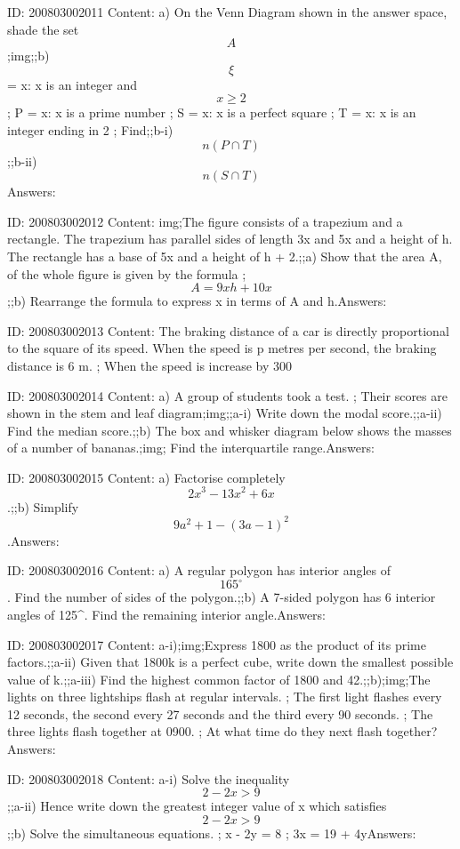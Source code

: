 \documentclass{article}
\begin{document}
ID: 200803002011
Content:
a) On the Venn Diagram shown in the answer space, shade the set $$A$$;img;;b) $$\xi$$ = {x: x is an integer and $$x \geq  2$$} ; P = {x: x is a prime number} ; S = {x: x is a perfect square} ; T = {x: x is an integer ending in 2} ; Find;;b-i) $$n(P \cap T)$$;;b-ii) $$n(S \cap T)$$Answers:

ID: 200803002012
Content:
img;The figure consists of a trapezium and a rectangle. The trapezium has parallel sides of length 3x and 5x and a height of h. The rectangle has a base of 5x and a height of h + 2.;;a) Show that the area A, of the whole figure is given by the formula ; $$A = 9xh + 10x$$;;b) Rearrange the formula to express x in terms of A and h.Answers:

ID: 200803002013
Content:
The braking distance of a car is directly proportional to the square of its speed. When the speed is p metres per second, the braking distance is 6 m. ; When the speed is increase by 300%

ID: 200803002014
Content:
a) A group of students took a test. ; Their scores are shown in the stem and leaf diagram;img;;a-i) Write down the modal score.;;a-ii) Find the median score.;;b) The box and whisker diagram below shows the masses of a number of bananas.;img; Find the interquartile range.Answers:

ID: 200803002015
Content:
a) Factorise completely $$2x^3 - 13x^2 + 6x$$.;;b) Simplify $$9a^2 + 1 - (3a - 1)^2$$.Answers:

ID: 200803002016
Content:
a) A regular polygon has interior angles of $$165^{\circ}$$. Find the number of sides of the polygon.;;b) A 7-sided polygon has 6 interior angles of 125^{\circ}. Find the remaining interior angle.Answers:

ID: 200803002017
Content:
a-i);img;Express 1800 as the product of its prime factors.;;a-ii) Given that 1800k is a perfect cube, write down the smallest possible value of k.;;a-iii) Find the highest common factor of 1800 and 42.;;b);img;The lights on three lightships flash at regular intervals. ; The first light flashes every 12 seconds, the second every 27 seconds and the third every 90 seconds. ; The three lights flash together at 0900. ; At what time do they next flash together?Answers:

ID: 200803002018
Content:
a-i) Solve the inequality $$2 - 2x > 9$$;;a-ii) Hence write down the greatest integer value of x which satisfies $$2 - 2 x > 9$$;;b) Solve the simultaneous equations. ; x - 2y = 8 ; 3x = 19 + 4yAnswers:
\end{document}
